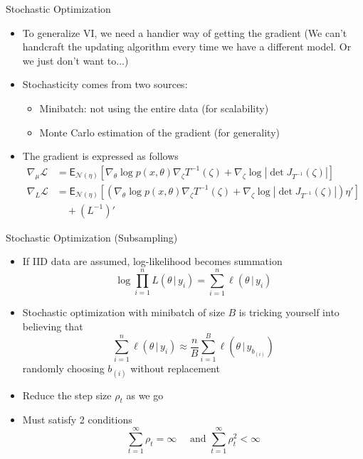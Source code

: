 \documentclass[color=usernames,dvipsnames]{beamer}
\begin{document}
\begin{frame}{Stochastic Optimization}
  \begin{itemize}
    \item<+-> To generalize VI, we need a handier way of getting the gradient (We can't handcraft the updating algorithm every time we have a different model. Or we just don't want to...)
    \item<+-> Stochasticity comes from two sources: \begin{itemize}
    \item Minibatch: not using the entire data (for scalability)
    \item Monte Carlo estimation of the gradient (for generality)
  \end{itemize}
    \item<+-> The gradient is expressed as follows
    \begin{align}
      \nabla_{\mu}\mathcal{L} &= \mathsf{E}_{\mathcal{N}(\eta)}\left[\nabla_{\theta}\log p(x,\theta)\nabla_{\zeta}T^{-1}(\zeta)+\nabla_{\zeta}\log\left|\det J_{T^{-1}}(\zeta)\right|\right]\\
      \nabla_{L}\mathcal{L} &= \mathsf{E}_{\mathcal{N}(\eta)}\left[\left(\nabla_{\theta}\log p(x,\theta)\nabla_{\zeta}T^{-1}(\zeta)+\nabla_{\zeta}\log\left|\det J_{T^{-1}}(\zeta)\right|\right)\eta' \right]\\
      &\quad +\left(L^{-1}\right)'
    \end{align}
  \end{itemize}
\end{frame}
\begin{frame}{Stochastic Optimization (Subsampling)}
  \begin{itemize}
    \item<+-> If IID data are assumed, log-likelihood becomes summation
    \begin{equation}
    \log \prod_{i=1}^{n}L(\theta\,|\,y_{i}) = \sum_{i=1}^{n}\ell(\theta\,|\,y_{i})
    \end{equation}
    \item<+-> Stochastic optimization with minibatch of size $B$ is tricking yourself into believing that
    \begin{equation}
      \sum_{i=1}^{n}\ell(\theta\,|\,y_{i}) \approx \dfrac{n}{B}\sum_{i=1}^{B}\ell(\theta\,|\,y_{b_{(i)}})
    \end{equation}
    randomly choosing $b_{(i)}$ without replacement
    \item<+-> Reduce the step size $\rho_{t}$ as we go
    \item<+-> Must satisfy 2 conditions
    \begin{equation}
      \sum_{t=1}^{\infty}\rho_{t}=\infty \quad \text{ and } \sum_{t=1}^{\infty}\rho_{t}^{2}<\infty
    \end{equation}
  \end{itemize}
\end{frame}
\end{document}

